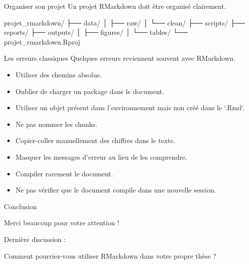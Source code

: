 \documentclass[
  10pt,
  ignorenonframetext,
]{beamer}
\newenvironment{Shaded}{\begin{snugshade}}{\end{snugshade}}
\newcommand{\NormalTok}[1]{#1}
\begin{document}
\begin{frame}[fragile]{Organiser son projet}
\label{organiser-son-projet}
Un projet RMarkdown doit être organisé clairement.

\begin{Shaded}
\begin{Highlighting}[]
\NormalTok{projet\_rmarkdown/}
\NormalTok{├── data/}
\NormalTok{│   ├── raw/}
\NormalTok{│   └── clean/}
\NormalTok{├── scripts/}
\NormalTok{├── reports/}
\NormalTok{├── outputs/}
\NormalTok{│   ├── figures/}
\NormalTok{│   └── tables/}
\NormalTok{└── projet\_rmarkdown.Rproj}
\end{Highlighting}
\end{Shaded}
\end{frame}

\begin{frame}{Les erreurs classiques}
\label{les-erreurs-classiques}
Quelques erreurs reviennent souvent avec RMarkdown.

\begin{itemize}
  \item Utiliser des chemins absolus.
  \item Oublier de charger un package dans le document.
  \item Utiliser un objet présent dans l’environnement mais non créé dans le `.Rmd`.
  \item Ne pas nommer les chunks.
  \item Copier-coller manuellement des chiffres dans le texte.
  \item Masquer les messages d’erreur au lieu de les comprendre.
  \item Compiler rarement le document.
  \item Ne pas vérifier que le document compile dans une nouvelle session.
\end{itemize}
\end{frame}

\begin{frame}{Conclusion}
\label{conclusion}
\centering
\Large

Merci beaucoup pour votre attention !

\vspace{0.5cm}

\large

Dernière discussion :

Comment pourriez-vous utiliser RMarkdown dans votre propre thèse ?
\end{frame}
\end{document}
